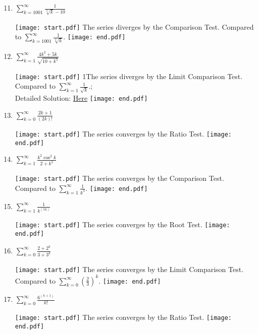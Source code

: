 \documentclass[12pt]{article}
\begin{document}
\begin{enumerate}
\setcounter{enumi}{10}

\item $\sum_{k=1001}^{\infty}{\frac{1}{\sqrt[3]{k}-10 }}$

\texttt{[image: start.pdf]}
{{The series diverges by the Comparison Test.  Compared to $\sum_{k=1001}^{\infty}{\frac{1}{\sqrt[3]{k}}}$.}}
\texttt{[image: end.pdf]}


\item $\sum_{k=1}^{\infty}{\frac{4k^2+5k}{\sqrt{10+k^5} }}$

\texttt{[image: start.pdf]}
{{{1\linewidth}{The series diverges by the Limit Comparison Test.  Compared to $\sum_{k=1}^{\infty}{\frac{1}{\sqrt{k}}}$.; \\Detailed Solution: \textcolor{blue}{\href{http://www.math.drexel.edu/classes/Calculus/resources/Math123HW/Solutions/123_09_Comparison_Ratio_Root_Tests_12.pdf}{Here}}}}}
\texttt{[image: end.pdf]}




\item $\sum_{k=0}^{\infty}{\frac{2k+1}{(2k)! }}$

\texttt{[image: start.pdf]}
{{The series converges by the Ratio Test.}}
\texttt{[image: end.pdf]}


\item $\sum_{k=1}^{\infty}{\frac{k^2\cos^2k}{2+k^5 }}$

\texttt{[image: start.pdf]}
{{The series converges by the Comparison Test.  Compared to $\sum_{k=1}^{\infty}{\frac{1}{k^3}}$.}}
\texttt{[image: end.pdf]}


\item $\sum_{k=1}^{\infty}{\frac{1}{k^{(5k)}}}$

\texttt{[image: start.pdf]}
{{The series converges by the Root Test.}}
\texttt{[image: end.pdf]}


\item $\sum_{k=0}^{\infty}{\frac{2+2^k}{3+3^k }}$

\texttt{[image: start.pdf]}
{{The series converges by the Limit Comparison Test.  Compared to $\sum_{k=0}^{\infty}{\left(\frac{2}{3}\right)^k     }$.}}
\texttt{[image: end.pdf]}


\item $\sum_{k=0}^{\infty}{\frac{6^{(k+1)}}{k! }}$

\texttt{[image: start.pdf]}
{{The series converges by the Ratio Test.}}
\texttt{[image: end.pdf]}



\end{enumerate}
\end{document}
